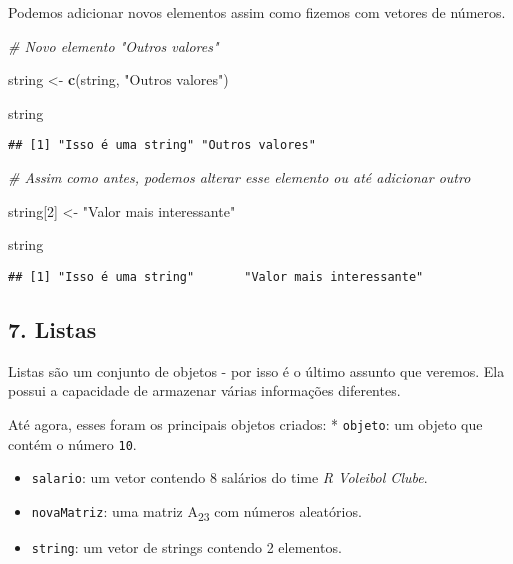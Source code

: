 \documentclass[
]{article}
\newenvironment{Shaded}{\begin{snugshade}}{\end{snugshade}}
\newcommand{\CommentTok}[1]{\textcolor[rgb]{0.56,0.35,0.01}{\textit{#1}}}
\newcommand{\DecValTok}[1]{\textcolor[rgb]{0.00,0.00,0.81}{#1}}
\newcommand{\KeywordTok}[1]{\textcolor[rgb]{0.13,0.29,0.53}{\textbf{#1}}}
\newcommand{\NormalTok}[1]{#1}
\newcommand{\StringTok}[1]{\textcolor[rgb]{0.31,0.60,0.02}{#1}}
\begin{document}
Podemos adicionar novos elementos assim como fizemos com vetores de
números.

\begin{Shaded}
\begin{Highlighting}[]
\CommentTok{# Novo elemento "Outros valores"}

\NormalTok{string <-}\StringTok{ }\KeywordTok{c}\NormalTok{(string, }\StringTok{"Outros valores"}\NormalTok{)}

\NormalTok{string}
\end{Highlighting}
\end{Shaded}

\begin{verbatim}
## [1] "Isso é uma string" "Outros valores"
\end{verbatim}

\begin{Shaded}
\begin{Highlighting}[]
\CommentTok{# Assim como antes, podemos alterar esse elemento ou até adicionar outro}

\NormalTok{string[}\DecValTok{2}\NormalTok{] <-}\StringTok{ "Valor mais interessante"}

\NormalTok{string}
\end{Highlighting}
\end{Shaded}

\begin{verbatim}
## [1] "Isso é uma string"       "Valor mais interessante"
\end{verbatim}

\hypertarget{listas}{%
\subsection{7. Listas}\label{listas}}

Listas são um conjunto de objetos - por isso é o último assunto que
veremos. Ela possui a capacidade de armazenar várias informações
diferentes.

Até agora, esses foram os principais objetos criados: * \texttt{objeto}:
um objeto que contém o número \texttt{10}.

\begin{itemize}
\item
  \texttt{salario}: um vetor contendo 8 salários do time \emph{R
  Voleibol Clube}.
\item
  \texttt{novaMatriz}: uma matriz A\textsubscript{23} com números
  aleatórios.
\item
  \texttt{string}: um vetor de strings contendo 2 elementos.
\end{itemize}
\end{document}
